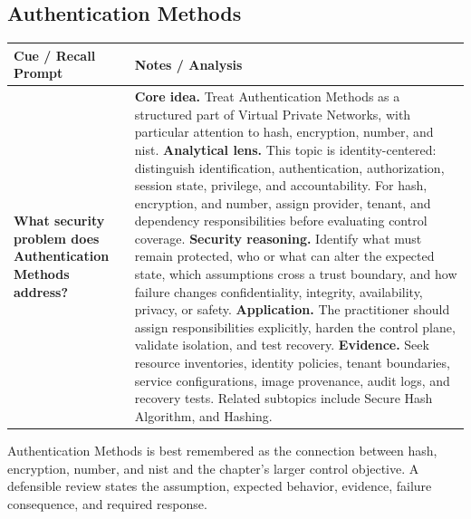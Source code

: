 \documentclass[11pt]{article}
\newcommand{\CornellHeader}{%
\rowcolor{Navy}\color{white}\bfseries Cue / Recall Prompt & \color{white}\bfseries Notes / Analysis\\\hline}
\newcommand{\CornellRow}[2]{%
\cellcolor{CueGray}\RaggedRight\textbf{#1} & \RaggedRight #2\\\hline}
\begin{document}
\subsection*{Authentication Methods}
\begin{longtable}{>{\RaggedRight\arraybackslash}p{}|>{\RaggedRight\arraybackslash}p{}}
\CornellHeader
\CornellRow{What security problem does Authentication Methods address?}{\textbf{Core idea.} Treat Authentication Methods as a structured part of Virtual Private Networks, with particular attention to hash, encryption, number, and nist. \textbf{Analytical lens.} This topic is identity-centered: distinguish identification, authentication, authorization, session state, privilege, and accountability. For hash, encryption, and number, assign provider, tenant, and dependency responsibilities before evaluating control coverage. \textbf{Security reasoning.} Identify what must remain protected, who or what can alter the expected state, which assumptions cross a trust boundary, and how failure changes confidentiality, integrity, availability, privacy, or safety. \textbf{Application.} The practitioner should assign responsibilities explicitly, harden the control plane, validate isolation, and test recovery. \textbf{Evidence.} Seek resource inventories, identity policies, tenant boundaries, service configurations, image provenance, audit logs, and recovery tests. Related subtopics include Secure Hash Algorithm, and Hashing.}
\end{longtable}
\begin{topicsummary}
Authentication Methods is best remembered as the connection between hash, encryption, number, and nist and the chapter's larger control objective. A defensible review states the assumption, expected behavior, evidence, failure consequence, and required response.
\end{topicsummary}
\end{document}
